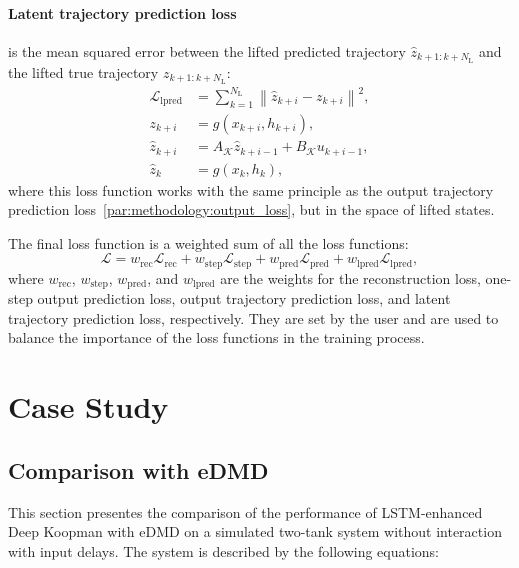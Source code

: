 \documentclass[conference]{IEEEtran}
\newcommand{\ui}[2]{#1_{\text{#2}}}  %
\begin{document}
\paragraph*{Latent trajectory prediction loss}
is the mean squared error between the lifted predicted trajectory \(\hat{z}_{k+1:k+\ui{N}{L}}\) and the lifted true trajectory \(z_{k+1:k+\ui{N}{L}}\):
\begin{subequations}
    \begin{align}
        \mathcal{L}_{\text{lpred}} & = \sum_{k=1}^{\ui{N}{L}}\left \|\hat{z}_{k+i} - z_{k+i}\right \|^2, \\
        z_{k+i}                    & = g(x_{k+i},h_{k+i}),                                                       \\
        \hat{z}_{k+i}              & = A_{\mathcal{K}}\hat{z}_{k+i-1}+B_{\mathcal{K}}u_{k+i-1},          \\
        \hat{z}_{k}                & = g(x_{k},h_k),
    \end{align}
\end{subequations}
where this loss function works with the same principle as the output trajectory prediction loss~\ref{par:methodology:output_loss}, but in the space of lifted states.

The final loss function is a weighted sum of all the loss functions:
\begin{equation}
    \mathcal{L} = \ui{w}{rec}\mathcal{L}_{\text{rec}} + \ui{w}{step}\mathcal{L}_{\text{step}} + \ui{w}{pred}\mathcal{L}_{\text{pred}} + \ui{w}{lpred}\mathcal{L}_{\text{lpred}},
\end{equation}
where \(\ui{w}{rec}\), \(\ui{w}{step}\), \(\ui{w}{pred}\), and \(\ui{w}{lpred}\) are the weights for the reconstruction loss, one-step output prediction loss, output trajectory prediction loss, and latent trajectory prediction loss, respectively. They are set by the user and are used to balance the importance of the loss functions in the training process.

\section{Case Study}\label{sec:results}

\subsection{Comparison with eDMD}\label{subsec:results:comparison_edmd}

This section presentes the comparison of the performance of LSTM-enhanced Deep Koopman with eDMD on a simulated two-tank system without interaction with input delays. The system is described by the following equations:
\end{document}
